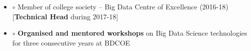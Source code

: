 \documentclass[a4paper,10pt]{article}
\begin{document}
\begin{itemize}
\item[] $\circ$  \hspace{0.0cm} Member of college society -- Big Data Centre of Excellence (2016-18) [\textbf{Technical Head} during  2017-18] \\[-0.55cm]

\item[] $\circ$  \hspace{0.0cm} \textbf{Organised and mentored workshops} on Big Data Science technologies for three consecutive years at BDCOE \\[-0.55cm]





    
	
\end{itemize}
\end{document}
